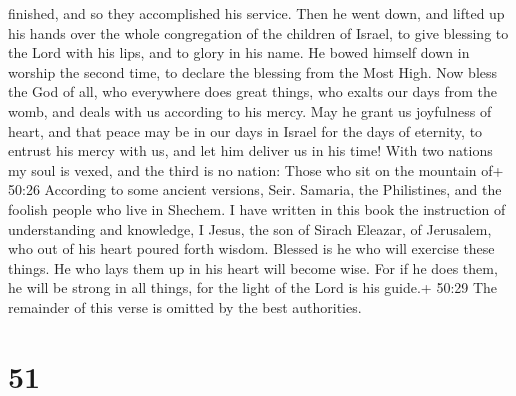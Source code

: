 finished, and so they accomplished his service.  Then he
went down, and lifted up his hands over the whole congregation of the
children of Israel, to give blessing to the Lord with his lips, and to
glory in his name.  He bowed himself down in worship the
second time, to declare the blessing from the Most High. 
Now bless the God of all, who everywhere does great things, who exalts
our days from the womb, and deals with us according to his mercy.
 May he grant us joyfulness of heart, and that peace may be
in our days in Israel for the days of eternity,  to entrust
his mercy with us, and let him deliver us in his time! 
With two nations my soul is vexed, and the third is no nation:
 Those who sit on the mountain of+ 50:26 According to some
ancient versions, Seir. Samaria, the Philistines, and the foolish people
who live in Shechem.  I have written in this book the
instruction of understanding and knowledge, I Jesus, the son of Sirach
Eleazar, of Jerusalem, who out of his heart poured forth wisdom.
 Blessed is he who will exercise these things. He who lays
them up in his heart will become wise.  For if he does
them, he will be strong in all things, for the light of the Lord is his
guide.+ 50:29 The remainder of this verse is omitted by the best
authorities.

\hypertarget{section-13}{%
\section{51}\label{section-13}}


